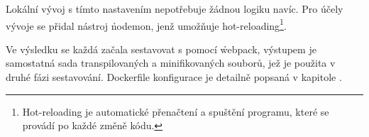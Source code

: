 Lokální vývoj s tímto nastavením nepotřebuje žádnou logiku navíc.
Pro účely vývoje se přidal nástroj \h{nodemon}, jenž umožňuje hot-reloading\footnote{Hot-reloading je automatické přenačtení a spuštění programu, které se provádí po každé změně kódu.}.

Ve výsledku se každá  začala sestavovat s pomocí \h{webpack}, výstupem je samostatná sada transpilovaných a minifikovaných souborů, jež je použita v druhé fázi sestavování.
Dockerfile konfigurace je detailně popsaná v kapitole .
